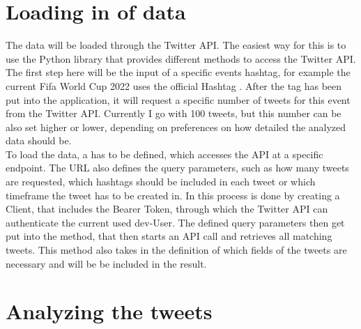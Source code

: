 \documentclass[a4paper,oneside,11pt]{scrreprt}
\begin{document}



\newpage


\chapter{Loading in of data}

The data will be loaded through the Twitter API. The easiest way for this is to use the Python library  that provides different methods to access the Twitter API. The first step here will be the input of a specific events hashtag, for example the current Fifa World Cup 2022 uses the official Hashtag . After the tag has been put into the application, it will request a specific number of tweets for this event from the Twitter API. Currently I go with 100 tweets, but this number can be also set higher or lower, depending on preferences on how detailed the analyzed data should be. \\

To load the data, a  has to be defined, which accesses the API at a specific endpoint. The URL also defines the query parameters, such as how many tweets are requested, which hashtags should be included in each tweet or which timeframe the tweet has to be created in. In  this process is done by creating a  Client, that includes the Bearer Token, through which the Twitter API can authenticate the current used dev-User. The defined query parameters then get put into the  method, that then starts an API call and retrieves all matching tweets. This method also takes in the definition of which fields of the tweets are necessary and will be be included in the result.


\chapter{Analyzing the tweets}
\end{document}
